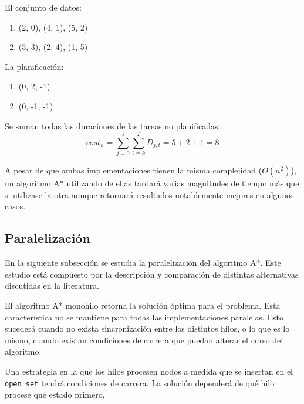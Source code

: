 \begin{examplebox}
    El conjunto de datos:
    \begin{enumerate}[itemsep=0.25px]
        \item (2, 0), (4, 1), (5, 2)
        \item (5, 3), (2, 4), (1, 5)
    \end{enumerate}
    La planificación:
    \begin{enumerate}[itemsep=0.25px]
        \item (0, 2, -1)
        \item (0, -1, -1)
    \end{enumerate}

    Se suman todas las duraciones de las tareas no planificadas:
    $$
    cost_h = \sum_{j=0}^{J}{
        \sum_{t=k}^{T}{
            D_{j,t}
        }
    }
    = 5 + 2 + 1 = 8
    $$ 
\end{examplebox}

\begin{notebox}
    A pesar de que ambas implementaciones tienen la misma complejidad ($O(n^2)$),
    un algoritmo A* utilizando de ellas tardará varias magnitudes de tiempo más que
    si utilizase la otra aunque retornará resultados notablemente mejores en algunos casos.
\end{notebox}

\pagebreak

\subsection{Paralelización}

En la siguiente subsección
se estudia la paralelización
del algoritmo A*.
Este estudio está compuesto por la descripción y
comparación de distintas alternativas discutidas en
la literatura.

El algoritmo A* monohilo retorna la solución óptima
para el problema.
Esta característica no se mantiene para todas las
implementaciones paralelas.
Esto sucederá cuando no exista sincronización
entre los distintos hilos,
o lo que es lo mismo,
cuando existan condiciones de carrera
que puedan alterar el curso del algoritmo.

\begin{examplebox}
    Una estrategia en la que los hilos procesen nodos
    a medida que se insertan en el \lstinline{open_set}
    tendrá condiciones de carrera.
    La solución dependerá de qué hilo procese qué estado
    primero.
\end{examplebox}


